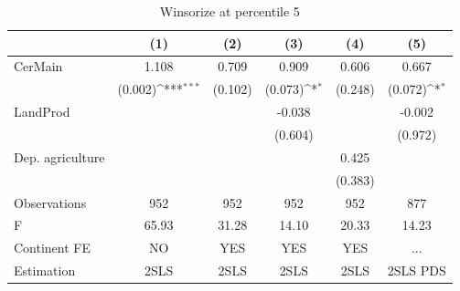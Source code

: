 \begin{table}[htbp]\centering
\def\sym#1{\ifmmode^{#1}\else\(^{#1}\)\fi}
\caption{Winsorize at percentile 5}
\begin{tabular}{l*{5}{c}}
\hline\hline
                &\multicolumn{1}{c}{(1)}         &\multicolumn{1}{c}{(2)}         &\multicolumn{1}{c}{(3)}         &\multicolumn{1}{c}{(4)}         &\multicolumn{1}{c}{(5)}         \\
\hline
CerMain         &    1.108         &    0.709         &    0.909         &    0.606         &    0.667         \\
                &  (0.002)\sym{***}&  (0.102)         &  (0.073)\sym{*}  &  (0.248)         &  (0.072)\sym{*}  \\
LandProd        &                  &                  &   -0.038         &                  &   -0.002         \\
                &                  &                  &  (0.604)         &                  &  (0.972)         \\
Dep. agriculture&                  &                  &                  &    0.425         &                  \\
                &                  &                  &                  &  (0.383)         &                  \\
\hline
Observations    &      952         &      952         &      952         &      952         &      877         \\
F               &    65.93         &    31.28         &    14.10         &    20.33         &    14.23         \\
Continent FE    &       NO         &      YES         &      YES         &      YES         &      ...         \\
Estimation      &     2SLS         &     2SLS         &     2SLS         &     2SLS         & 2SLS PDS         \\
\hline\hline
\end{tabular}
\end{table}
